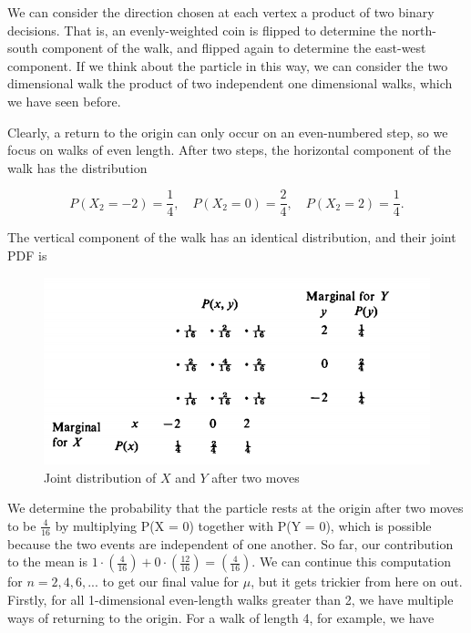 \documentclass[11pt]{article}
\begin{document}
We can consider the direction chosen at each vertex a product of two binary decisions. That is, an evenly-weighted coin is flipped to determine the north-south component of the walk, and flipped again to determine the east-west component. If we think about the particle in this way, we can consider the two dimensional walk the product of two independent one dimensional walks, which we have seen before. 

Clearly, a return to the origin can only occur on an even-numbered step, so we focus on walks of even length. After two steps, the horizontal component of the walk has the distribution

\begin{equation}
P(X_{2} = -2) = \frac{1}{4} , \quad P(X_{2} = 0) = \frac{2}{4} , \quad P(X_{2} = 2) = \frac{1}{4}. 
\end{equation}

The vertical component of the walk has an identical distribution, and their joint PDF is

\begin{figure}[h]
\centering
\includegraphics[scale = 1]{jointPDF}
\caption{Joint distribution of $X$ and $Y$ after two moves \protect\cite{50}}
\label{fig:jointPDF}
\end{figure}

We determine the probability that the particle rests at the origin after two moves to be $\frac{4}{16}$ by multiplying P(X = 0) together with P(Y = 0), which is possible because the two events are independent of one another. So far, our contribution to the mean is $1 \cdot (\frac{4}{16}) + 0 \cdot (\frac{12}{16}) = (\frac{4}{16})$. We can continue this computation for $n = 2, 4, 6, ... $ to get our final value for $\mu$, but it gets trickier from here on out. 
\\

Firstly, for all 1-dimensional even-length walks greater than 2, we have multiple ways of returning to the origin. For a walk of length 4, for example, we have 
\end{document}
